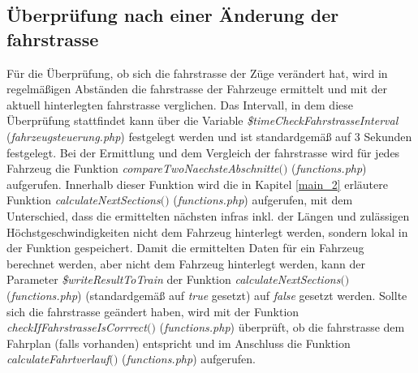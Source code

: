 \subsection{Überprüfung nach einer Änderung der \Gls{fahrstrasse}}
Für die Überprüfung, ob sich die \Gls{fahrstrasse} der Züge verändert hat, wird in regelmäßigen Abständen die \Gls{fahrstrasse} der Fahrzeuge ermittelt und mit der aktuell hinterlegten \Gls{fahrstrasse} verglichen. Das Intervall, in dem diese Überprüfung stattfindet kann über die Variable \textit{\$timeCheckFahrstrasseInterval} (\textit{fahrzeugsteuerung.php}) festgelegt werden und ist standardgemäß auf 3 Sekunden festgelegt. Bei der Ermittlung und dem Vergleich der \Gls{fahrstrasse} wird für jedes Fahrzeug die Funktion \textit{compare\-Two\-Naechste\-Abschnitte$($$)$} (\textit{functions.php}) aufgerufen. Innerhalb dieser Funktion wird die in Kapitel \ref{main_2} erläutere Funktion \textit{calculateNextSections$($$)$} \mbox{(\textit{functions.php})} aufgerufen, mit dem Unterschied, dass die ermittelten nächsten \acp{infra} inkl. der Längen und zulässigen Höchstgeschwindigkeiten nicht dem Fahrzeug hinterlegt werden, sondern lokal in der Funktion gespeichert. Damit die ermittelten Daten für ein Fahrzeug berechnet werden, aber nicht dem Fahrzeug hinterlegt werden, kann der Parameter \textit{\$writeResultToTrain} der Funktion \textit{calculateNextSections$($$)$} (\textit{functions.php}) (standardgemäß auf \textit{true} gesetzt) auf \textit{false} gesetzt werden. Sollte sich die \Gls{fahrstrasse} geändert haben, wird mit der Funktion \textit{check\-If\-Fahr\-strasse\-Is\-Corrrect$($$)$} (\textit{functions.php}) überprüft, ob die \Gls{fahrstrasse} dem Fahrplan (falls vorhanden) entspricht und im Anschluss die Funktion \textit{cal\-cu\-late\-Fahrt\-verlauf$($$)$} (\textit{functions.php}) aufgerufen.
